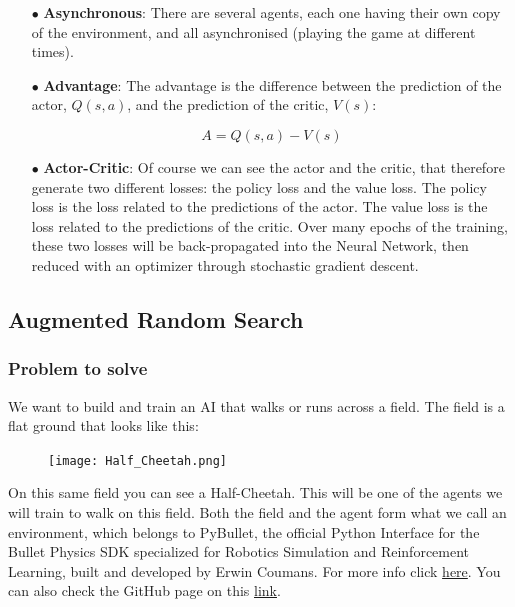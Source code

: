\documentclass[]{book}
\begin{document}
\begin{itemize}

\item[$\bullet$] \textbf{Asynchronous}: There are several agents, each one having their own copy of the environment, and all asynchronised (playing the game at different times).

\item[$\bullet$] \textbf{Advantage}: The advantage is the difference between the prediction of the actor, $Q(s,a)$, and the prediction of the critic, $V(s)$:

\begin{equation*}
A = Q(s,a) - V(s)
\end{equation*}

\item[$\bullet$] \textbf{Actor-Critic}: Of course we can see the actor and the critic, that therefore generate two different losses: the policy loss and the value loss. The policy loss is the loss related to the predictions of the actor. The value loss is the loss related to the predictions of the critic. Over many epochs of the training, these two losses will be back-propagated into the Neural Network, then reduced with an optimizer through stochastic gradient descent.

\end{itemize}

\newpage

\subsection{Augmented Random Search}

\subsubsection{Problem to solve}

We want to build and train an AI that walks or runs across a field. The field is a flat ground that looks like this:

\begin{figure}[!htbp]
        \begin{center}
            \texttt{[image: Half\_Cheetah.png]}
        \end{center}
\end{figure}

On this same field you can see a Half-Cheetah. This will be one of the agents we will train to walk on this field. Both the field and the agent form what we call an environment, which belongs to PyBullet, the official Python Interface for the Bullet Physics SDK specialized for Robotics Simulation and Reinforcement Learning, built and developed by Erwin Coumans. For more info click \href{https://docs.google.com/document/d/10sXEhzFRSnvFcl3XxNGhnD4N2SedqwdAvK3dsihxVUA/edit}{here}. You can also check the GitHub page on this \href{https://github.com/bulletphysics/bullet3}{link}.
\end{document}
